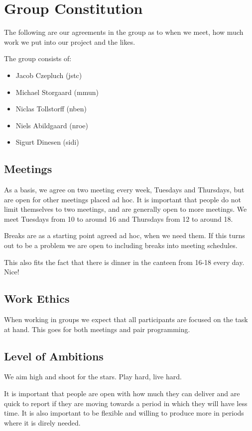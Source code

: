 \section{Group Constitution}
\label{sec:group-constitution}

The following are our agreements in the group as to when we meet, how much work we put into our project and the likes.

The group consists of:
\begin{itemize}
    \item Jacob Czepluch (jstc)
    \item Michael Storgaard (mmun)
    \item Niclas Tollstorff (nben)
    \item Niels Abildgaard (nroe)
    \item Sigurt Dinesen (sidi)
\end{itemize}

\subsection{Meetings}
As a basis, we agree on two meeting every week, Tuesdays and Thursdays, but are open for other meetings placed ad hoc. It is important that people do not limit themselves to two meetings, and are generally open to more meetings. We meet Tuesdays from 10 to around 16 and Thursdays from 12 to around 18.

Breaks are as a starting point agreed ad hoc, when we need them. If this turns out to be a problem we are open to including breaks into meeting schedules.

This also fits the fact that there is dinner in the canteen from 16-18 every day. Nice!

\subsection{Work Ethics}
When working in groups we expect that all participants are focused on the task at hand. This goes for both meetings and pair programming.

\subsection{Level of Ambitions}
We aim high and shoot for the stars. Play hard, live hard.

It is important that people are open with how much they can deliver and are quick to report if they are moving towards a period in which they will have less time. It is also important to be flexible and willing to produce more in periods where it is direly needed.